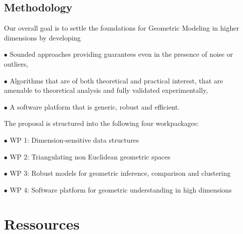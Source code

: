 





\subsection{Methodology}

Our overall goal is to settle the foundations for Geometric Modeling in higher dimensions by
developing 

\sind $\bullet$ Sounded approaches providing guarantees even in the presence of noise or outliers,


\sind $\bullet$  Algorithms that are of both theoretical and practical interest, that are amenable to theoretical analysis and fully validated experimentally,

\sind $\bullet$ A software platform that is generic, robust and efficient.

The proposal is structured into the following four workpackages:


\sind $\bullet$  {WP 1:  Dimension-sensitive data  structures} 


\sind $\bullet$  {WP 2:  Triangulating non Euclidean geometric spaces}


\sind $\bullet$  {WP 3: Robust models for geometric inference, comparison and  clustering}


\sind $\bullet$  {WP 4:  Software platform for geometric understanding in high dimensions} 











\section{Ressources}


